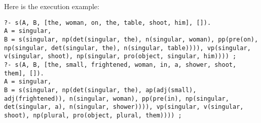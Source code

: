 \documentclass{article}
\begin{document}
\noindent
Here is the execution example:
\begin{verbatim}
?- s(A, B, [the, woman, on, the, table, shoot, him], []).
A = singular,
B = s(singular, np(det(singular, the), n(singular, woman), pp(pre(on), np(singular, det(singular, the), n(singular, table)))), vp(singular, v(singular, shoot), np(singular, pro(object, singular, him)))) ;  
?- s(A, B, [the, small, frightened, woman, in, a, shower, shoot, them], []).
A = singular,
B = s(singular, np(det(singular, the), ap(adj(small), adj(frightened)), n(singular, woman), pp(pre(in), np(singular, det(singular, a), n(singular, shower)))), vp(singular, v(singular, shoot), np(plural, pro(object, plural, them)))) ;
\end{verbatim}
\end{document}
